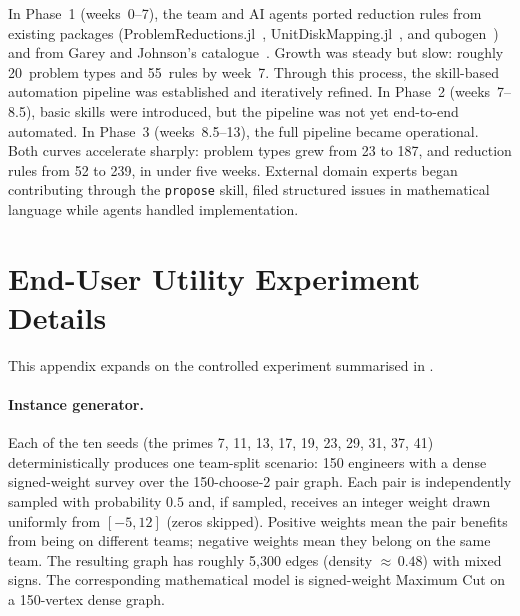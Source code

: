 \documentclass{article}
\begin{document}
In Phase~1 (weeks~0--7), the team and AI agents ported reduction rules from existing packages (ProblemReductions.jl~\cite{gao2025programming}, UnitDiskMapping.jl~\cite{Nguyen2023UnitDiskMapping,pan2025encodingcomputationallyhardproblems}, and qubogen~\cite{Tamura2020qubogen}) and from Garey and Johnson's catalogue~\cite{garey1979}.
Growth was steady but slow: roughly 20~problem types and 55~rules by week~7.
Through this process, the skill-based automation pipeline was established and iteratively refined.
In Phase~2 (weeks~7--8.5), basic skills were introduced, but the pipeline was not yet end-to-end automated.
In Phase~3 (weeks~8.5--13), the full pipeline became operational.
Both curves accelerate sharply: problem types grew from 23 to 187, and reduction rules from 52 to 239, in under five weeks.
External domain experts began contributing through the \texttt{propose} skill, filed structured issues in mathematical language while agents handled implementation.

\section{End-User Utility Experiment Details}\label{app:end-user}

This appendix expands on the controlled experiment summarised in .

\paragraph{Instance generator.}
Each of the ten seeds (the primes 7, 11, 13, 17, 19, 23, 29, 31, 37, 41) deterministically produces one team-split scenario: 150 engineers with a dense signed-weight survey over the 150-choose-2 pair graph. Each pair is independently sampled with probability $0.5$ and, if sampled, receives an integer weight drawn uniformly from $[-5, 12]$ (zeros skipped). Positive weights mean the pair benefits from being on different teams; negative weights mean they belong on the same team. The resulting graph has roughly 5{,}300 edges (density ${\approx}\,0.48$) with mixed signs. The corresponding mathematical model is signed-weight Maximum Cut on a 150-vertex dense graph.
\end{document}
